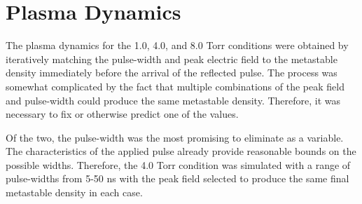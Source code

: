 \section{Plasma Dynamics}

The plasma dynamics for the 1.0, 4.0, and 8.0 Torr conditions were obtained by
iteratively matching the pulse-width and peak electric field to the metastable
density immediately before the arrival of the reflected pulse. The process was
somewhat complicated by the fact that multiple combinations of the peak field
and pulse-width could produce the same metastable density. Therefore, it was
necessary to fix or otherwise predict one of the values.

Of the two, the pulse-width was the most promising to eliminate as a variable.
The characteristics of the applied pulse already provide reasonable bounds on
the possible widths. Therefore, the 4.0 Torr condition was simulated with a
range of pulse-widths from 5-50 ns with the peak field selected to produce the
same final metastable density in each case. 

